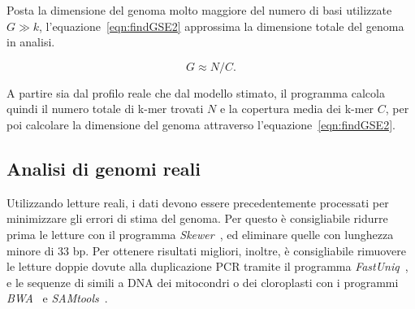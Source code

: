 \documentclass[crop=false, class=book]{standalone}
\begin{document}
	Posta la dimensione del genoma molto maggiore del numero di basi utilizzate $G\gg k$, l'equazione~\vref{eqn:findGSE2} approssima la dimensione totale del genoma in analisi.
	
	\begin{equation}
		\label{eqn:findGSE2}
		G\approx N/C.
	\end{equation}

	A partire sia dal profilo reale che dal modello stimato, il programma calcola quindi il numero totale di k-mer trovati $N$ e la copertura media dei k-mer $C$, per poi calcolare la dimensione del genoma attraverso l'equazione~\vref{eqn:findGSE2}.
	
	\subsection{Analisi di genomi reali}
	Utilizzando letture reali, i dati devono essere precedentemente processati per minimizzare gli errori di stima del genoma. Per questo è consigliabile ridurre prima le letture con il programma \textit{Skewer}~\cite{jiang2014skewer}, ed eliminare quelle con lunghezza minore di 33 bp. Per ottenere risultati migliori, inoltre, è consigliabile rimuovere le letture doppie dovute alla duplicazione PCR tramite il programma \textit{FastUniq}~\cite{xu2012fastuniq}, e le sequenze di simili a DNA dei mitocondri o dei cloroplasti con i programmi \textit{BWA}~\cite{li2009fast} e \textit{SAMtools}~\cite{li2009sequence}.
	
\end{document}
